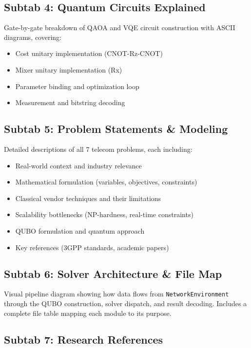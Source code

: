 \documentclass[11pt,a4paper]{article}
\begin{document}
\subsection{Subtab 4: Quantum Circuits Explained}

Gate-by-gate breakdown of QAOA and VQE circuit construction with ASCII diagrams, covering:
\begin{itemize}
  \item Cost unitary implementation (CNOT-Rz-CNOT)
  \item Mixer unitary implementation (Rx)
  \item Parameter binding and optimization loop
  \item Measurement and bitstring decoding
\end{itemize}

\subsection{Subtab 5: Problem Statements \& Modeling}

Detailed descriptions of all 7 telecom problems, each including:
\begin{itemize}
  \item Real-world context and industry relevance
  \item Mathematical formulation (variables, objectives, constraints)
  \item Classical vendor techniques and their limitations
  \item Scalability bottlenecks (NP-hardness, real-time constraints)
  \item QUBO formulation and quantum approach
  \item Key references (3GPP standards, academic papers)
\end{itemize}

\subsection{Subtab 6: Solver Architecture \& File Map}

Visual pipeline diagram showing how data flows from \texttt{NetworkEnvironment} through the QUBO construction, solver dispatch, and result decoding. Includes a complete file table mapping each module to its purpose.

\subsection{Subtab 7: Research References}
\end{document}
